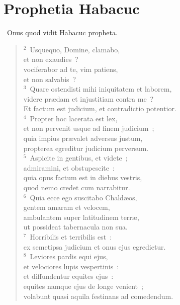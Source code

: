 \clearpage
{\centering \section*{Prophetia Habacuc}}\thispagestyle{empty}

~Onus quod vidit Habacuc propheta.


\begin{flushleft}\begin{verse}\vspace{6pt}${}^{2}$~Usquequo, Domine, clamabo,\\ et non exaudies~?\\ vociferabor ad te, vim patiens,\\ et non salvabis~?\\
${}^{3}$~Quare ostendisti mihi iniquitatem et laborem,\\ videre pr\ae dam et injustitiam contra me~?\\ Et factum est judicium, et contradictio potentior.\\
${}^{4}$~Propter hoc lacerata est lex,\\ et non pervenit usque ad finem judicium~;\\ quia impius pr\ae valet adversus justum,\\ propterea egreditur judicium perversum.\\
${}^{5}$~Aspicite in gentibus, et videte~;\\ admiramini, et obstupescite~:\\ quia opus factum est in diebus vestris,\\ quod nemo credet cum narrabitur.\\
${}^{6}$~Quia ecce ego suscitabo Chald\ae os,\\ gentem amaram et velocem,\\ ambulantem super latitudinem terr\ae ,\\ ut possideat tabernacula non sua.\\
${}^{7}$~Horribilis et terribilis est~:\\ ex semetipsa judicium et onus ejus egredietur.\\
${}^{8}$~Leviores pardis equi ejus,\\ et velociores lupis vespertinis~:\\ et diffundentur equites ejus~:\\ equites namque ejus de longe venient~;\\ volabunt quasi aquila festinans ad comedendum.\\

\end{verse}
\end{flushleft}
